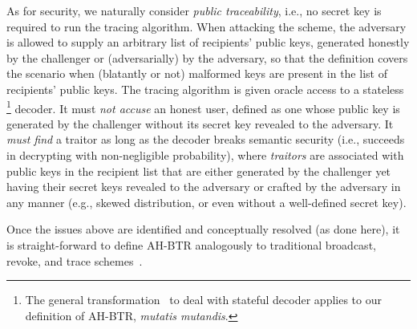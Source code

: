 As for security,
we naturally consider \emph{public traceability},
i.e., no secret key is required to run the tracing algorithm.
When attacking the scheme, the adversary is allowed to supply an arbitrary list of recipients' public keys, generated honestly by the challenger or (adversarially) by the adversary, so that the definition covers the scenario when (blatantly or not) malformed keys are present in the list of recipients' public keys.
The tracing algorithm is given oracle access to a stateless%
\footnote{The general transformation~\cite{DRM:KiaYun01,EC:BonSahWat06} to deal with stateful decoder applies to our definition of AH-BTR, \textit{mutatis mutandis}.}
decoder.
It must \emph{not accuse} an honest user, defined as one whose public key is generated by the challenger without its secret key revealed to the adversary.
It \emph{must find} a traitor as long as the decoder breaks semantic security (i.e., succeeds in decrypting with non-negligible probability), where \emph{traitors} are associated with public keys in the recipient list that are either generated by the challenger yet having their secret keys revealed to the adversary or crafted by the adversary in any manner (e.g., skewed distribution, or even without a well-defined secret key).

Once the issues above are identified and conceptually resolved (as done here),
it is straight-forward to define AH-BTR analogously to traditional broadcast, revoke, and trace schemes~\cite{FC:NaoPin00,C:NaoNaoLot01,C:GQWW19}.
